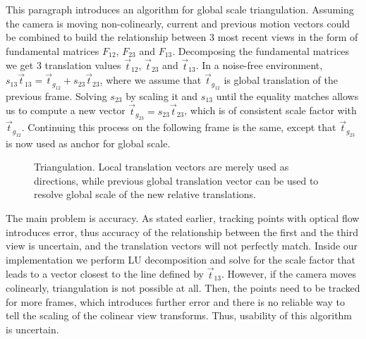 \documentclass[11pt,english]{report}
\begin{document}
This paragraph introduces an algorithm for global scale triangulation. Assuming the camera is moving non-colinearly, current and previous motion vectors could be combined to build the relationship between 3 most recent views in the form of fundamental matrices $F_{12}$, $F_{23}$ and $F_{13}$. Decomposing the fundamental matrices we get 3 translation values $\overrightarrow{t}_{12}$, $\overrightarrow{t}_{23}$ and $\overrightarrow{t}_{13}$. In a noise-free environment, $s_{13}\overrightarrow{t}_{13} = \overrightarrow{t}_{g_{12}} + s_{23}\overrightarrow{t}_{23}$, where we assume that $\overrightarrow{t}_{g_{12}}$ is global translation of the previous frame. Solving $s_{23}$ by scaling it and $s_{13}$ until the equality matches allows us to compute a new vector $\overrightarrow{t}_{g_{23}} = s_{23}\overrightarrow{t}_{23}$, which is of consistent scale factor with $\overrightarrow{t}_{g_{12}}$. Continuing this process on the following frame is the same, except that $\overrightarrow{t}_{g_{23}}$ is now used as anchor for global scale.

\begin{figure}[!ht]
	\centering
	\caption{\centering Triangulation. Local translation vectors are merely used as directions, while previous global translation vector can be used to resolve global scale of the new relative translations.}
\end{figure}

The main problem is accuracy. As stated earlier, tracking points with optical flow introduces error, thus accuracy of the relationship between the first and the third view is uncertain, and the translation vectors will not perfectly match. Inside our implementation we perform LU decomposition and solve for the scale factor that leads to a vector closest to the line defined by $\overrightarrow{t}_{13}$. However, if the camera moves colinearly, triangulation is not possible at all. Then, the points need to be tracked for more frames, which introduces further error and there is no reliable way to tell the scaling of the colinear view transforms. Thus, usability of this algorithm is uncertain.
\end{document}
